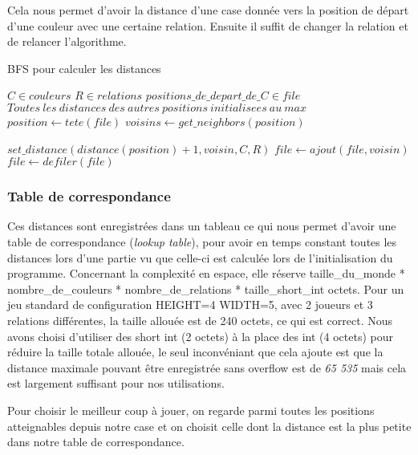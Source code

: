 Cela nous permet d'avoir la distance d'une case donnée vers la position de départ d'une couleur avec une certaine relation. 
Ensuite il suffit de changer la relation et de relancer l'algorithme.

\begin{algorithm}
    \caption{BFS pour calculer les distances}\label{alg:cap}
    \begin{algorithmic}
    \Require $C \in couleurs$
    \Require $R \in relations$
    \Require $positions\_de\_depart\_de\_C \in file $
    \Require $Toutes\ les\ distances\ des\ autres\ positions\ initialisees\ au\ max$
    \State $position \gets tete(file)$
    \State $voisins \gets get\_neighbors(position)$

        \State $set\_distance(distance(position) + 1, voisin, C, R)$
        \State $file \gets ajout(file, voisin)$
    \EndIf
    \EndFor
    \State $file \gets defiler(file)$
    \EndWhile
    \end{algorithmic}
\end{algorithm}

\subsubsection{Table de correspondance}

Ces distances sont enregistrées dans un tableau ce qui nous permet d'avoir une table de correspondance (\emph{lookup table}),
pour avoir en temps constant toutes les distances lors d'une partie vu que celle-ci est calculée lors de l'initialisation
du programme. Concernant la complexité en espace, elle réserve 
taille\_du\_monde * nombre\_de\_couleurs * nombre\_de\_relations * taille\_short\_int octets. Pour un jeu standard de configuration
 HEIGHT=4 WIDTH=5, avec 2 joueurs et 3 relations différentes, la taille allouée est de 240 octets, ce qui est correct.
Nous avons choisi d'utiliser des short int (2 octets) à la place des int (4 octets) pour réduire la taille totale allouée,
le seul inconvéniant que cela ajoute est que la distance maximale pouvant être enregistrée sans overflow est de \emph{65 535} mais cela
est largement suffisant pour nos utilisations.

Pour choisir le meilleur coup à jouer, on regarde parmi toutes les positions atteignables depuis 
notre case et on choisit celle dont la distance est la plus petite dans notre table de correspondance.

